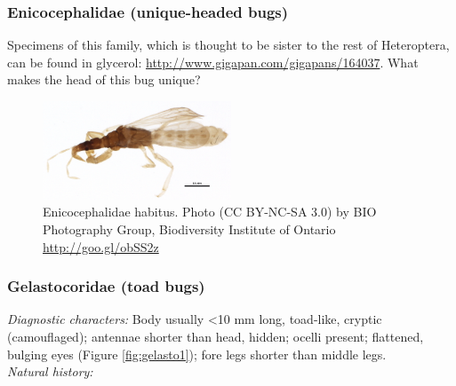 \documentclass[letterpaper, 11pt]{article}
\begin{document}
\subsubsection{Enicocephalidae (unique-headed bugs)}
\noindent{}Specimens of this family, which is thought to be sister to the rest of Heteroptera, can be found in glycerol: \url{http://www.gigapan.com/gigapans/164037}. What makes the head of this bug unique?

\begin{figure}[ht!]
 \centering
 \includegraphics[width=0.5\textwidth]{EnicocephalidHabitus}
 \caption{Enicocephalidae habitus. Photo (CC BY-NC-SA 3.0) by BIO Photography Group, Biodiversity Institute of Ontario \url{http://goo.gl/obSS2z}}
 \label{fig:enicocephalid}
\end{figure}

\subsubsection{Gelastocoridae (toad bugs)}
\noindent{}\textit{Diagnostic characters:} Body usually \textless{}10 mm long, toad-like, cryptic (camouflaged); antennae shorter than head, hidden; ocelli present; flattened, bulging eyes (Figure \ref{fig:gelasto1}); fore legs shorter than middle legs.\\

\noindent{}\textit{Natural history:} \\
\end{document}
